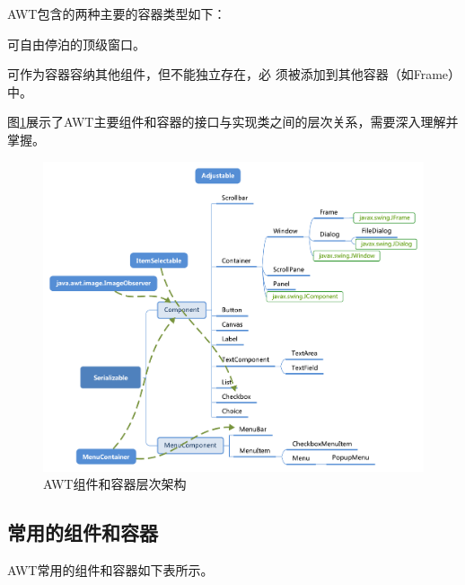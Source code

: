 AWT包含的两种主要的容器类型如下：
  
\begin{description}\kai
\item[\fbox{java.awt.Window}] 可自由停泊的顶级窗口。
\item[\fbox{java.awt.Panel}] 可作为容器容纳其他组件，但不能独立存在，必
  须被添加到其他容器（如Frame）中。
\end{description}

图\ref{fig:fig-AWT-component-arch}展示了AWT主要组件和容器的接口与实现类之间的层次关系，需要深入理解并掌握。

\begin{figure}[htb]
  \centering
  \includegraphics[width=\textwidth]{images/Java-GUI-programming/fig-AWT-component-arch.pdf}
  \caption{AWT组件和容器层次架构}
  \label{fig:fig-AWT-component-arch}
\end{figure}

\subsection{常用的组件和容器}

AWT常用的组件和容器如下表所示。


